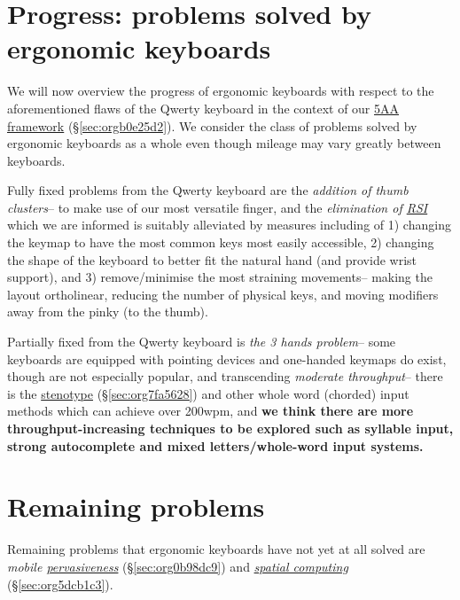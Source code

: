\documentclass[logo,bsc,singlespacing,parskip]{infthesis}
\begin{document}
\section{Progress: problems solved by ergonomic keyboards}
\label{sec:org9c5fd9c}
We will now overview the progress of ergonomic keyboards with respect to the aforementioned flaws of the Qwerty keyboard in the context of our \hyperref[sec:orgb0e25d2]{5AA framework} (\S  \ref{sec:orgb0e25d2}).
We consider the class of problems solved by ergonomic keyboards as a whole even though mileage may vary greatly between keyboards.

Fully fixed problems from the Qwerty keyboard are the \emph{addition of thumb clusters}-- to make use of our most versatile finger,  and the \emph{elimination of \hyperref[orgc186d45]{RSI}} which we are informed is suitably alleviated by measures including of 1) changing the keymap to have the most common keys most easily accessible, 2) changing the shape of the keyboard to better fit the natural hand (and provide wrist support), and 3) remove/minimise the most straining movements-- making the layout ortholinear, reducing the number of physical keys, and moving modifiers away from the pinky (to the thumb).

Partially fixed from the Qwerty keyboard is \emph{the 3 hands problem}-- some keyboards are equipped with pointing devices and one-handed keymaps do exist, though are not especially popular, and transcending \emph{moderate throughput}-- there is the  \hyperref[sec:org7fa5628]{stenotype} (\S  \ref{sec:org7fa5628}) and other whole word (chorded) input methods which can achieve over 200wpm, and \textbf{we think there are more throughput-increasing techniques to be explored such as syllable input, strong autocomplete and mixed letters/whole-word input systems.}

\section{Remaining problems}
\label{sec:org209ed33}
Remaining problems that ergonomic keyboards have not yet at all solved are \emph{mobile \hyperref[sec:org0b98dc9]{pervasiveness}} (\S  \ref{sec:org0b98dc9}) and \emph{\hyperref[sec:org5dcb1c3]{spatial computing}} (\S  \ref{sec:org5dcb1c3}).
\end{document}
